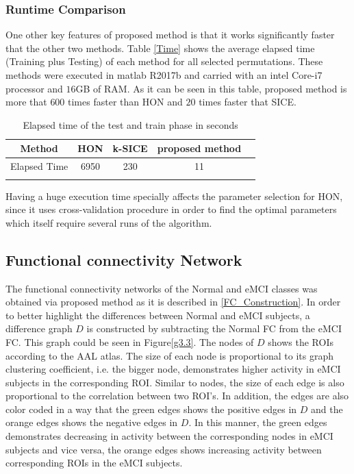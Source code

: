 \documentclass[journal]{IEEEtran}
\begin{document}
	\subsubsection{Runtime Comparison}
	One other key features of proposed method is that it works significantly faster that the other two methods. Table \eqref{Time} shows the average elapsed time (Training plus Testing) of each method for all selected permutations. These methods were executed in matlab R2017b and carried with an intel Core-i7 processor and $16$GB of RAM. As it can be seen in this table, proposed method is more that $600$ times faster than HON and $20$ times faster that SICE.   
	\begin{table}
		\begin{center}
			\caption{Elapsed time of the test and train phase in seconds}
			\begin{tabular}{@{}c*{4}{c}}
				\hline\hline
				Method& HON & k-SICE& proposed method 
				\\
				\hline
				Elapsed Time  &6950& 230 & 11 
				\\
				\hline\hline
				\label{Time}
			\end{tabular}
		\end{center}
	\end{table}
	Having a huge execution time specially affects the parameter selection for HON, since it uses cross-validation procedure in order to find the optimal parameters which itself require several  runs of the algorithm. 
	
	
	
	
	\subsection{Functional connectivity Network}
	The functional connectivity networks of the Normal and eMCI classes was obtained via proposed method as it is described in \eqref{FC_Construction}.
	In order to better highlight the differences between Normal and eMCI subjects, a difference graph $D$ is constructed by subtracting the Normal FC from the eMCI FC. This graph could be seen in Figure\eqref{g3.3}. 
	The nodes of $D$ shows the ROIs according to the AAL atlas. The size of each node is proportional to its graph clustering coefficient, i.e. the bigger node, demonstrates higher activity in eMCI subjects in the corresponding ROI. 
	Similar to nodes, the size of each edge is also proportional to the correlation between two ROI's. In addition, the edges are also color coded in a way that the green edges shows the positive edges in $D$ and the orange edges shows the negative edges in $D$. In this manner, the green edges demonstrates decreasing in activity between the corresponding nodes in eMCI subjects and vice versa, the orange edges shows increasing activity between corresponding ROIs in the eMCI subjects.   
	
\end{document}
